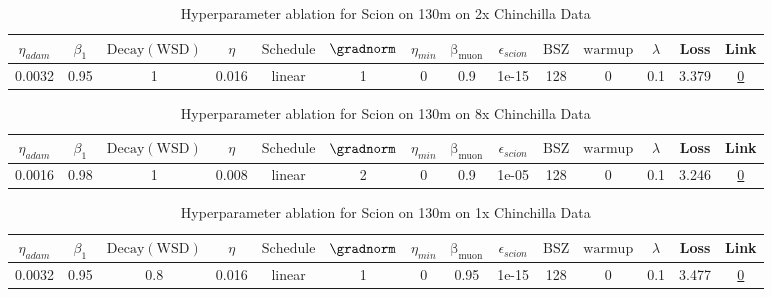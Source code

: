 \begin{table}[H]
\centering
\caption{Hyperparameter ablation for Scion on 130m on 2x Chinchilla Data}
\label{tab:ablation_scion_130m_2}
\begin{tabular}{cccccccccccccc}
\toprule
$\eta_{adam}$ & $\beta_1$ & $\mathrm{Decay (WSD)}$ & $\eta$ & $\mathrm{Schedule}$ & $\gradnorm$ & $\eta_{min}$ & $\mathrm{\beta_{muon}}$ & $\epsilon_{scion}$ & $\mathrm{BSZ}$ & $\mathrm{warmup}$ & $\lambda$ & Loss & Link \\
\midrule
0.0032 & 0.95 & 1 & 0.016 & linear & 1 & 0 & 0.9 & 1e-15 & 128 & 0 & 0.1 & 3.379 & \href{https://wandb.ai/stanford-mercury/optimizer-scaling/runs/sweep-130m-5B-sciona647e8lr0.016-wd0.1-minlr0-warmup0-b10.95-gn1-9e502b}{0} \\
\midrule
\bottomrule
\end{tabular}
\end{table}

\begin{table}[H]
\centering
\caption{Hyperparameter ablation for Scion on 130m on 8x Chinchilla Data}
\label{tab:ablation_scion_130m_8}
\begin{tabular}{cccccccccccccc}
\toprule
$\eta_{adam}$ & $\beta_1$ & $\mathrm{Decay (WSD)}$ & $\eta$ & $\mathrm{Schedule}$ & $\gradnorm$ & $\eta_{min}$ & $\mathrm{\beta_{muon}}$ & $\epsilon_{scion}$ & $\mathrm{BSZ}$ & $\mathrm{warmup}$ & $\lambda$ & Loss & Link \\
\midrule
0.0016 & 0.98 & 1 & 0.008 & linear & 2 & 0 & 0.9 & 1e-05 & 128 & 0 & 0.1 & 3.246 & \href{https://wandb.ai/stanford-mercury/optimizer-scaling/runs/sweep-130m-21B-scion51ccaelr0.008-wd0.1-minlr0-warmup0-b10.98-gn-4abd83}{0} \\
\midrule
\bottomrule
\end{tabular}
\end{table}

\begin{table}[H]
\centering
\caption{Hyperparameter ablation for Scion on 130m on 1x Chinchilla Data}
\label{tab:ablation_scion_130m_1}
\begin{tabular}{cccccccccccccc}
\toprule
$\eta_{adam}$ & $\beta_1$ & $\mathrm{Decay (WSD)}$ & $\eta$ & $\mathrm{Schedule}$ & $\gradnorm$ & $\eta_{min}$ & $\mathrm{\beta_{muon}}$ & $\epsilon_{scion}$ & $\mathrm{BSZ}$ & $\mathrm{warmup}$ & $\lambda$ & Loss & Link \\
\midrule
0.0032 & 0.95 & 0.8 & 0.016 & linear & 1 & 0 & 0.95 & 1e-15 & 128 & 0 & 0.1 & 3.477 & \href{https://wandb.ai/stanford-mercury/optimizer-scaling/runs/sweep-130m-2B-scion88e825lr0.016-wd0.1-minlr0-warmup0-b10.95-gn1-09a932}{0} \\
\midrule
\bottomrule
\end{tabular}
\end{table}

